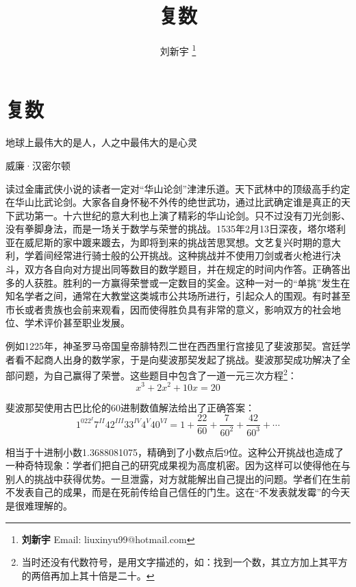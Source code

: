 \documentclass[b5paper]{ctexart}
\begin{document}
\title{复数}

\author{刘新宇
\thanks{{\bfseries 刘新宇} \newline
  Email: liuxinyu99@hotmail.com \newline}
  }

\maketitle
\fi


\ifx\wholebook\relax
\chapter{复数}
\fi

\epigraph{地球上最伟大的是人，人之中最伟大的是心灵}{威廉·汉密尔顿}

读过金庸武侠小说的读者一定对“华山论剑”津津乐道。天下武林中的顶级高手约定在华山比武论剑。大家各自身怀秘不外传的绝世武功，通过比武确定谁是真正的天下武功第一。十六世纪的意大利也上演了精彩的华山论剑。只不过没有刀光剑影、没有拳脚身法，而是一场关于数学与荣誉的挑战。1535年2月13日深夜，塔尔塔利亚在威尼斯的家中踱来踱去，为即将到来的挑战苦思冥想。文艺复兴时期的意大利，学着间经常进行骑士般的公开挑战。这种挑战并不使用刀剑或者火枪进行决斗，双方各自向对方提出同等数目的数学题目，并在规定的时间内作答。正确答出多的人获胜。胜利的一方赢得荣誉或一定数目的奖金。这种一对一的“单挑”发生在知名学者之间，通常在大教堂这类城市公共场所进行，引起众人的围观。有时甚至市长或者贵族也会前来观看，因而使得胜负具有非常的意义，影响双方的社会地位、学术评价甚至职业发展。

例如1225年，神圣罗马帝国皇帝腓特烈二世在西西里行宫接见了斐波那契。宫廷学者看不起商人出身的数学家，于是向斐波那契发起了挑战。斐波那契成功解决了全部问题，为自己赢得了荣誉。这些题目中包含了一道一元三次方程\footnote{当时还没有代数符号，是用文字描述的，如：找到一个数，其立方加上其平方的两倍再加上其十倍是二十。}：\[x^3 + 2x^2 + 10x = 20\]

斐波那契使用古巴比伦的60进制数值解法给出了正确答案：
\[
1^022^{I}7^{II}42^{III}33^{IV}4^{V}40^{VI} = 1 + \frac{22}{60} + \frac{7}{60^2} + \frac{42}{60^3} + \dotsb
\]

相当于十进制小数1.3688081075，精确到了小数点后9位。这种公开挑战也造成了一种奇特现象：学者们把自己的研究成果视为高度机密。因为这样可以使得他在与别人的挑战中获得优势。一旦泄露，对方就能解出自己提出的问题。学者们在生前不发表自己的成果，而是在死前传给自己信任的门生。这在“不发表就发霉”的今天是很难理解的\cite{HanXueTao2012}。
\end{document}
